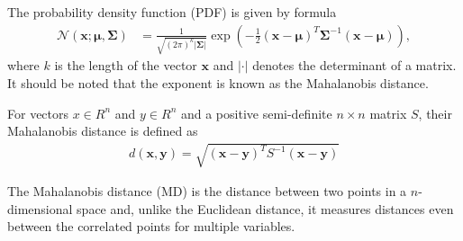 The probability density function (PDF) is given by formula
\begin{align}
    \mathcal{N}(\mathbf{x};\mathbf{\mu},\mathbf{\Sigma}) &= \frac{1}{\sqrt{(2\pi)^k |\mathbf{\Sigma}|}}\exp \left(-\frac{1}{2}(\mathbf{x}-\mathbf{\mu})^T\mathbf{\Sigma}^{-1}(\mathbf{x}-\mathbf{\mu}) \right),
\end{align}
where $k$ is the length of the vector $\mathbf{x}$ and $|\cdot|$ denotes the determinant of a matrix. It should be
noted that the exponent is known as the Mahalanobis distance.
\begin{definition}
    For vectors $x \in R^n$ and $y \in R^n$ and a positive semi-definite $n\times n$ matrix $S$, their Mahalanobis
    distance is defined as
    \begin{align}
        d(\mathbf{x},\mathbf{y}) = \sqrt{(\mathbf{x}-\mathbf{y})^T S^{-1} (\mathbf{x}-\mathbf{y})}
    \end{align}
\end{definition}
The Mahalanobis distance (MD) is the distance between two points in a $n$-dimensional space and, unlike the Euclidean
distance, it measures distances even between the correlated points for multiple variables.

